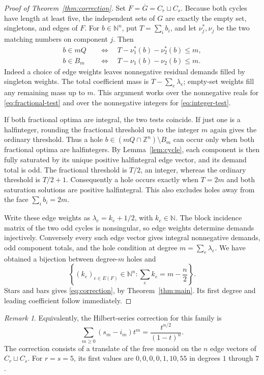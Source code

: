 \documentclass[11pt]{article}
\theoremstyle{remark}
\newtheorem{remark}[theorem]{Remark}
\newcommand{\NN}{\mathbb N}
\newcommand{\ZZ}{\mathbb Z}
\begin{document}
\begin{proof}[Proof of Theorem~\ref{thm:correction}]
Set $F=\overline G=C_r\sqcup C_s$. Because both cycles have length at
least five, the independent sets of $G$ are exactly the empty set,
singletons, and edges of $F$. For $b\in\NN^n$, put $T=\sum_i b_i$,
and let $\nu_j^*,\nu_j$ be the two matching numbers on component $j$.
Then
\begin{align}
b\in mQ&\quad\Longleftrightarrow\quad
T-\nu_1^*(b)-\nu_2^*(b)\leq m,\label{eq:fractional-test}\\
b\in B_m&\quad\Longleftrightarrow\quad
T-\nu_1(b)-\nu_2(b)\leq m.\label{eq:integer-test}
\end{align}
Indeed a choice of edge weights leaves nonnegative residual demands
filled by singleton weights. The total coefficient mass is
$T-\sum_e\lambda_e$; empty-set weights fill any remaining mass up to
$m$. This argument works over the nonnegative reals for
\eqref{eq:fractional-test} and over the nonnegative integers for
\eqref{eq:integer-test}.

If both fractional optima are integral, the two tests coincide. If just
one is a halfinteger, rounding the fractional threshold up to the
integer $m$ again gives the ordinary threshold. Thus a hole
$b\in(mQ\cap\ZZ^n)\setminus B_m$ can occur only when both fractional
optima are halfintegers. By Lemma~\ref{lem:cycle}, each component is then
fully saturated by its unique positive halfintegral edge vector, and
its demand total is odd. The fractional threshold is $T/2$, an integer,
whereas the ordinary threshold is $T/2+1$. Consequently a hole occurs
exactly when $T=2m$ and both saturation solutions are positive
halfintegral. This also excludes holes away from the face
$\sum_i b_i=2m$.

Write these edge weights as $\lambda_e=k_e+1/2$, with $k_e\in\NN$.
The block incidence matrix of the two odd cycles is nonsingular, so
edge weights determine demands injectively. Conversely every such
edge vector gives integral nonnegative demands, odd component totals,
and the hole condition at degree $m=\sum_e\lambda_e$. We have obtained
a bijection between degree-$m$ holes and
\[
\left\{(k_e)_{e\in E(F)}\in\NN^n:
\sum_e k_e=m-\frac n2\right\}.
\]
Stars and bars gives \eqref{eq:correction}, by
Theorem~\ref{thm:main}. Its first degree and leading coefficient follow
immediately.
\end{proof}

\begin{remark}
Equivalently, the Hilbert-series correction for this family is
\[
\sum_{m\geq0}(s_m-i_m)t^m=\frac{t^{n/2}}{(1-t)^n}.
\]
The correction consists of a translate of the free monoid on the $n$
edge vectors of $C_r\sqcup C_s$. For $r=s=5$, its first values are
$0,0,0,0,1,10,55$ in degrees $1$ through $7$.
\end{remark}
\end{document}

